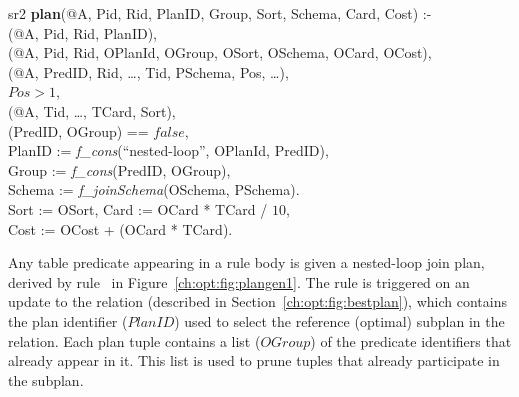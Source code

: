 \begin{figure*}
\ssp
\centering
\begin{boxedminipage}{\linewidth}
\linenumbers

sr2 {\bf plan}(@A, Pid, Rid, PlanID, Group, Sort, Schema, Card, Cost) :- \\
(@A, Pid, Rid, PlanID),\\
(@A, Pid, Rid, OPlanId, OGroup, OSort, OSchema, OCard, OCost), \\
(@A, PredID, Rid, \ldots, Tid, PSchema, Pos, \ldots), \\
\datalogspace $Pos > 1$,\\
(@A, Tid, \ldots, TCard, Sort),\\
(PredID, OGroup) == $false$,\\
\datalogspace PlanID := {\em f\_cons}(``nested-loop'', OPlanId, PredID), \\
\datalogspace Group := {\em f\_cons}(PredID, OGroup), \\
\datalogspace Schema := {\em f\_joinSchema}(OSchema, PSchema).\\
\datalogspace Sort := OSort,
\datalogspace Card := OCard * TCard / $10$,\\
\datalogspace Cost := OCost + (OCard * TCard).

\end{boxedminipage}
\caption{\label{ch:opt:fig:plangen1}nested-loop join method.}
\end{figure*}

Any table predicate appearing in a rule body is given a nested-loop join plan,
derived by rule~ in Figure~\ref{ch:opt:fig:plangen1}.  The rule is
triggered on an update to the  relation (described in
Section~\ref{ch:opt:fig:bestplan}), which contains the plan identifier
($PlanID$) used to select the reference (optimal) subplan in the 
relation.  Each plan tuple contains a list ($OGroup$) of the predicate
identifiers that already appear in it.  This list is used to prune
 tuples that already participate in the subplan.


